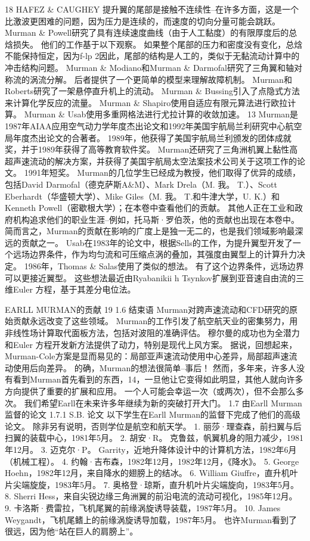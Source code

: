 \documentclass[UTF8,11pt,a4paper,openany,fontset=fandol]{ctexbook}
\begin{document}
18 HAFEZ \& CAUGHEY 提升翼的尾部是接触不连续性--在许多方面，这是一个比激波更困难的问题，因为压力是连续的，而速度的切向分量可能会跳跃。 Murman \& Powell研究了具有连续速度曲线（由于人工黏度）的有限厚度后的总焓损失。 他们的工作基于以下观察。 如果整个尾部的压力和密度没有变化，总焓不能保持恒定，因为f-lp 2因此，尾部的结构是人工的，类似于无黏流动计算中的冲击结构问题。 Murman \& Modiano和Murman \& Darmofal研究了三角翼和轴对称流的涡流分解。 后者提供了一个更简单的模型来理解故障机制。 Murman和Roberts研究了一架悬停直升机上的流动。 Murman \& Bussing引入了点隐式方法来计算化学反应的流量。 Murman \& Shapiro使用自适应有限元算法进行欧拉计算。 Murman \& Usab使用多重网格法进行尤拉计算的收敛加速。 13 Murman是1987年AIAA应用空气动力学年度杰出论文和1992年美国宇航局兰利研究中心航空局年度杰出论文的合著者。 1989年，他获得了美国宇航局兰利颁发的团体成就奖，并于1989年获得了高等教育软件奖。 Murman还研究了三角洲机翼上黏性高超声速流动的解决方案，并获得了美国宇航局太空法案技术公司关于这项工作的论文。 1991年短奖。 Murman的几位学生已经成为教授，他们取得了优异的成绩，包括David Darmofal（德克萨斯A\&M）、Mark Drela（M. 我。 T.）、Scott Eberhardt（华盛顿大学）、Mike Giles（M. 我。 T.和牛津大学，U. K.）和Kenneth Powell（密歇根大学）；在本卷中查看他们的贡献。 其他人正在工业和政府机构追求他们的职业生涯--例如，托马斯·罗伯茨，他的贡献也出现在本卷中。 简而言之，Murman的贡献在影响的广度上是独一无二的，也是我们领域影响最深远的贡献之一。 Usab在1983年的论文中，根据Sells的工作，为提升翼型开发了一个远场边界条件，作为均匀流和可压缩点涡的叠加，其强度由翼型上的计算升力决定。 1986年，Thomas \& Salas使用了类似的想法。 有了这个边界条件，远场边界可以更接近翼型。 这些想法最近由Ryabanikii h Tsynkov扩展到亚音速自由流的三维Euler 方程，基于其差分电位法。

EARLL MURMAN的贡献 19 1.6 结束语 Murman对跨声速流动和CFD研究的原始贡献永远改变了这些领域。 Murman的工作引发了航空航天业的密集努力，用非线性场计算取代面板方法，包括对波阻的准确评估。 穆尔曼的成功也为全潜力和Euler 方程开发新方法提供了动力，特别是现代上风方案。 据说，回想起来，Murman-Cole方案是显而易见的：局部亚声速流动使用中心差异，局部超声速流动使用后向差异。 的确，Murman的想法很简单--事后！ 然而，多年来，许多人没有看到Murman首先看到的东西，14，一旦他让它变得如此明显，其他人就向许多方向提供了重要的扩展和应用。 一个人可能会幸运一次（或两次），但不会那么多次。 我们希望Earll在未来许多年继续为新的突破打开大门。 1.7 由Earll Murman监督的论文 1.7.1 S.B. 论文 以下学生在Earll Murman的监督下完成了他们的高级论文。 除非另有说明，否则学位是航空和航天学。 1. 丽莎·理查森，前扫翼与后扫翼的装载中心，1981年5月。 2. 胡安·R。 克鲁兹，帆翼机身的阻力减少，1981年12月。 3. 迈克尔·P。 Garrity，近地升降体设计中的计算机方法，1982年6月（机械工程）。 4. 约翰·吉布森，1982年12月，1982年12月，《降水》。 5. George Hoehn，1982年12月，来自降水的翅膀上的结冰。 6. William Giuffre，直升机叶片尖端旋旋，1983年5月。 7. 奥格登·琼斯，直升机叶片尖端旋向，1983年5月。 8. Sherri Hess，来自尖锐边缘三角洲翼的前沿电流的流动可视化，1985年12月。 9. 卡洛斯·费雷拉，飞机尾翼的前缘涡旋诱导装载，1987年5月。 10. James Weygandt，飞机尾鳍上的前缘涡旋诱导加载，1987年5月。 也许Murman看到了很远，因为他“站在巨人的肩膀上”。
\end{document}
